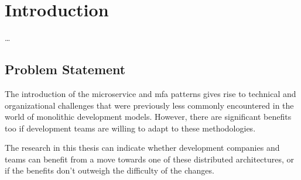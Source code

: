 
\chapter{Introduction}
\label{ch:introduction}




\dots %

\section{Problem Statement}
\label{sec:problem-statement}


The introduction of the \gls{microservice} and \gls{mfa} patterns gives rise to
technical and organizational challenges that were previously less commonly
encountered in the world of \gls{monolithic} development models. However, there
are significant benefits too if development teams are willing to adapt to these
methodologies. 

The research in this thesis can indicate whether development companies and teams
can benefit from a move towards one of these distributed architectures, or if
the benefits don't outweigh the difficulty of the changes.

